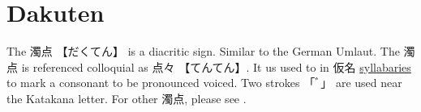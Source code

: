 \section{Dakuten} \label{sec:Dakuten}

The {濁点} {【だくてん】} is a diacritic sign. Similar to the German Umlaut.
The {濁点} is referenced colloquial as {点々} {【てんてん】}.  It us used to in
{仮名} \hyperref[sec:Syllable]{syllabaries} to mark a consonant to be
pronounced voiced. Two strokes {「ﾞ」} are used near the Katakana letter.  For
other {濁点}, please see .

